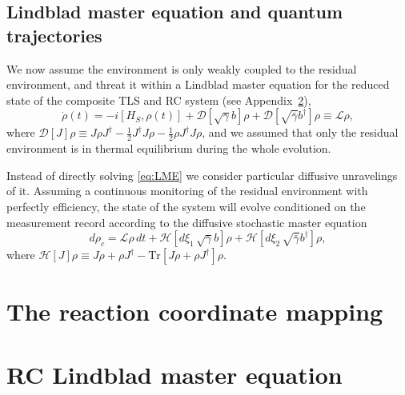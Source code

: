 \documentclass[%
preprint,
onecolumn,
notitlepag,
 amsmath,amssymb,
 aps,
 pra,
]{revtex4-2}
\newcommand{\tr}{\mbox{Tr}}
\begin{document}
\subsection{Lindblad master equation and quantum trajectories}

We now assume the environment is only weakly coupled to the residual environment, and threat it within a Lindblad master equation for the reduced state of the composite TLS and RC system (see Appendix~\ref{B:LME}),
\begin{equation}
\label{eq:LME}
\dot{\rho}(t) = -i [H_{S}, \rho(t)] + \mathcal{D}[\sqrt{\gamma} b] \rho + \mathcal{D}[\sqrt{\bar{\gamma}} b^{\dag}] \rho \equiv \mathcal{L}\rho,
\end{equation}
where $\mathcal{D}[J]\rho \equiv J\rho J^{\dag} - \frac{1}{2} J^{\dag} J \rho - \frac{1}{2}  \rho J^{\dag} J \rho$, and we assumed that only the residual environment is in thermal equilibrium during the whole evolution. 

Instead of directly solving \eqref{eq:LME} we consider particular diffusive unravelings of it. Assuming a continuous monitoring of the residual environment with perfectly efficiency, the state of the system will evolve conditioned on the measurement record according to the diffusive stochastic master equation
\begin{equation}
d\rho_{c} = \mathcal{L}\rho \, dt +  \mathcal{H}[d\xi_{1}\,\sqrt{\gamma} b] \rho +  \mathcal{H}[d\xi_{2}\, \sqrt{\bar{\gamma}} b^{\dag}] \rho,
\end{equation} 
where $\mathcal{H}[J] \rho \equiv  J \rho + \rho J^{\dag} - \tr [J \rho + \rho J^{\dag}] \rho$.

\appendix
\section{The reaction coordinate mapping}
\label{A:RCmap}

\section{RC Lindblad master equation}
\label{B:LME}

%


%
\end{document}
